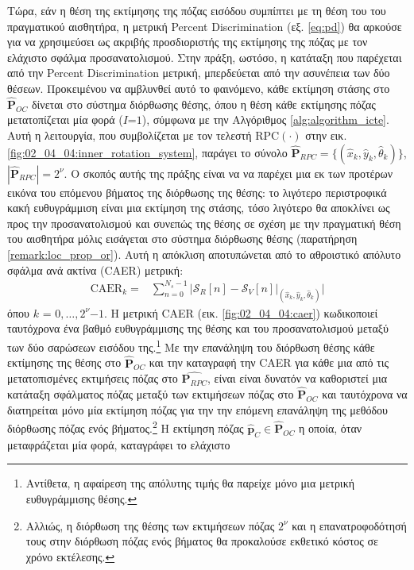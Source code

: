 Τώρα, εάν η θέση της εκτίμησης της πόζας εισόδου συμπίπτει με τη θέση του του
πραγματικού αισθητήρα, η μετρική Percent Discrimination (εξ. \ref{eq:pd}) θα
αρκούσε για να χρησιμεύσει ως ακριβής προσδιοριστής της εκτίμησης της πόζας με
τον ελάχιστο σφάλμα προσανατολισμού. Στην πράξη, ωστόσο, η κατάταξη που
παρέχεται από την Percent Discrimination μετρική, μπερδεύεται από την ασυνέπεια
των δύο θέσεων.  Προκειμένου να αμβλυνθεί αυτό το φαινόμενο, κάθε εκτίμηση
στάσης στο $\hat{\bm{P}}_{OC}$ δίνεται στο σύστημα διόρθωσης θέσης, όπου η θέση
κάθε εκτίμησης πόζας μετατοπίζεται μία φορά ($I$=$1$), σύμφωνα με την
Αλγόριθμος \ref{alg:algorithm_icte}. Αυτή η λειτουργία, που συμβολίζεται με τον
τελεστή RPC$(\cdot)$ στην εικ. \ref{fig:02_04_04:inner_rotation_system}, παράγει το σύνολο
$\hat{\bm{P}}_{RPC} = \{(\hat{x}_k, \hat{y}_k, \hat{\theta}_k)\}$,
$|\hat{\bm{P}}_{RPC}| = 2^\nu$.  Ο σκοπός αυτής της πράξης είναι να να παρέχει
μια εκ των προτέρων εικόνα του επόμενου βήματος της διόρθωσης της θέσης: το
λιγότερο περιστροφικά κακή ευθυγράμμιση είναι μια εκτίμηση της στάσης, τόσο
λιγότερο θα αποκλίνει ως προς την προσανατολισμού και συνεπώς της θέσης σε
σχέση με την πραγματική θέση του αισθητήρα μόλις εισάγεται στο σύστημα
διόρθωσης θέσης (παρατήρηση \ref{remark:loc_prop_or}). Αυτή η απόκλιση
αποτυπώνεται από το αθροιστικό απόλυτο σφάλμα ανά ακτίνα (CAER) μετρική:
\begin{align}
  \text{CAER}_k = & \sum\limits_{n=0}^{N_s-1} \Bigg| \mathcal{S}_R[n] - \mathcal{S}_V[n]\Big|_{(\hat{x}_k, \hat{y}_k, \hat{\theta}_k)} \Bigg|
  \label{eq:caer}
\end{align}
όπου $k$ = $0,\dots,2^\nu$$-$$1$. Η μετρική CAER (εικ. \ref{fig:02_04_04:caer})
κωδικοποιεί ταυτόχρονα ένα βαθμό ευθυγράμμισης της θέσης και του
προσανατολισμού μεταξύ των δύο σαρώσεων εισόδου της.\footnote{Αντίθετα, η
αφαίρεση της απόλυτης τιμής θα παρείχε μόνο μια μετρική ευθυγράμμισης θέσης.}
Με την επανάληψη του διόρθωση θέσης κάθε εκτίμησης της θέσης στο
$\hat{\bm{P}}_{OC}$ και την καταγραφή την CAER για κάθε μια από τις
μετατοπισμένες εκτιμήσεις πόζας στο $\hat{\bm{P}_{RPC}}$, είναι είναι δυνατόν
να καθοριστεί μια κατάταξη σφάλματος πόζας μεταξύ των εκτιμήσεων πόζας στο
$\hat{\bm{P}}_{OC}$ και ταυτόχρονα να διατηρείται μόνο μία εκτίμηση πόζας για
την την επόμενη επανάληψη της μεθόδου διόρθωσης πόζας ενός
βήματος.\footnote{Αλλιώς, η διόρθωση της θέσης των εκτιμήσεων πόζας $2^\nu$ και
η επανατροφοδότησή τους στην διόρθωση πόζας ενός βήματος θα προκαλούσε εκθετικό
κόστος σε χρόνο εκτέλεσης.} Η εκτίμηση πόζας $\hat{\bm{p}}_C \in
\hat{\bm{P}}_{OC}$ η οποία, όταν μεταφράζεται μία φορά, καταγράφει το ελάχιστο
